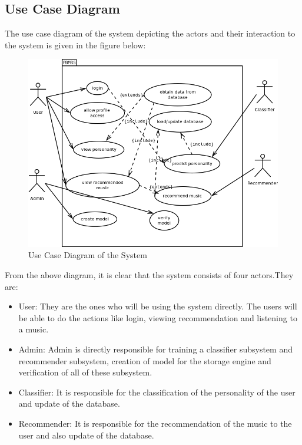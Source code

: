 \newpage
\subsection{Use Case Diagram}
The use case diagram of the system depicting the actors and their interaction to the system is given in the figure below:
\begin{figure}[!ht]
\centering
\includegraphics[width = 16 cm]{fig/usecase.png}
\caption{Use Case Diagram of the System}
\label{fig:usecase}
\end{figure}

From the above diagram, it is clear that the system consists of four actors.They are:
\begin{itemize}
\item User: They are the ones who will be using the system directly. The users will be able to do the actions like login, viewing recommendation and listening to a music.
\item Admin: Admin is directly responsible for training a classifier subsystem and recommender subsystem, creation of model for the storage engine and verification of all of these subsystem.
\item Classifier: It is responsible for the classification of the personality of the user and update of the database.
\item Recommender: It is responsible for the recommendation of the music to the user and also update of the database.
\end{itemize}

